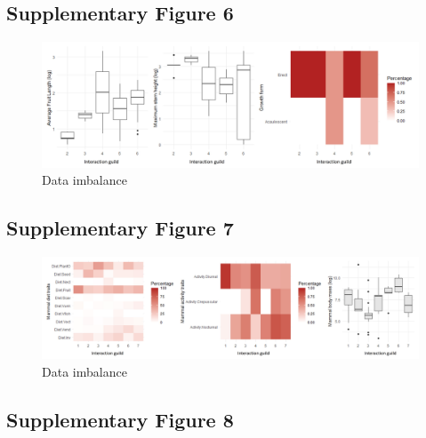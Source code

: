 \documentclass[
]{agujournal2019}
\begin{document}
\subsection{Supplementary Figure 6}

\begin{figure}[H]

{\centering \includegraphics[width=5.67708in,height=\textheight]{sup_figures/palm_trait_sbm.jpg}

}

\caption{Data imbalance}

\end{figure}%

\subsection{Supplementary Figure 7}

\begin{figure}[H]

{\centering \includegraphics[width=5.67708in,height=\textheight]{sup_figures/mammal_trait_sbm.jpg}

}

\caption{Data imbalance}

\end{figure}%

\subsection{Supplementary Figure 8}
\end{document}
